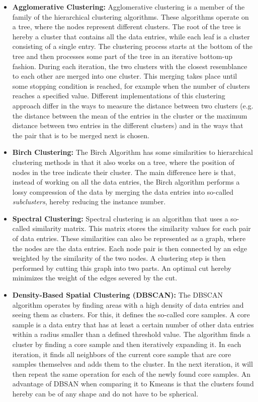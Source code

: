 \begin{itemize}
	\item \textbf{Agglomerative Clustering:} Agglomerative clustering is a member of the family of the hierarchical clustering algorithms. These algorithms operate on a tree, where the nodes represent different clusters. The root of the tree is hereby a cluster that contains all the data entries, while each leaf is a cluster consisting of a single entry. The clustering process starts at the bottom of the tree and then processes some part of the tree in an iterative bottom-up fashion. During each iteration, the two clusters with the closest resemblance to each other are merged into one cluster. This merging takes place until some stopping condition is reached, for example when the number of clusters reaches a specified value. Different implementations of this clustering approach differ in the ways to measure the distance between two clusters (e.g. the distance between the mean of the entries in the cluster or the maximum distance between two entries in the different clusters) and in the ways that the pair that is to be merged next is chosen.
	
	\item \textbf{Birch Clustering:} The Birch Algorithm has some similarities to hierarchical clustering methods in that it also works on a tree, where the position of nodes in the tree indicate their cluster. The main difference here is that, instead of working on all the data entries, the Birch algorithm performs a lossy compression of the data by merging the data entries into so-called \emph{subclusters}, hereby reducing the instance number.
	
	\item \textbf{Spectral Clustering:} Spectral clustering is an algorithm that uses a so-called similarity matrix. This matrix stores the similarity values for each pair of data entries. These similarities can also be represented as a graph, where the nodes are the data entries. Each node pair is then connected by an edge weighted by the similarity of the two nodes. A clustering step is then performed by cutting this graph into two parts. An optimal cut hereby minimizes the weight of the edges severed by the cut.
	
	\item \textbf{Density-Based Spatial Clustering (DBSCAN):} The DBSCAN algorithm operates by finding areas with a high density of data entries and seeing them as clusters. For this, it defines the so-called core samples. A core sample is a data entry that has at least a certain number of other data entries within a radius smaller than a defined threshold value. The algorithm finds a cluster by finding a core sample and then iteratively expanding it. In each iteration, it finds all neighbors of the current core sample that are core samples themselves and adds them to the cluster. In the next iteration, it will then repeat the same operation for each of the newly found core samples. An advantage of DBSAN when comparing it to Kmeans is that the clusters found hereby can be of any shape and do not have to be spherical.
\end{itemize} 



